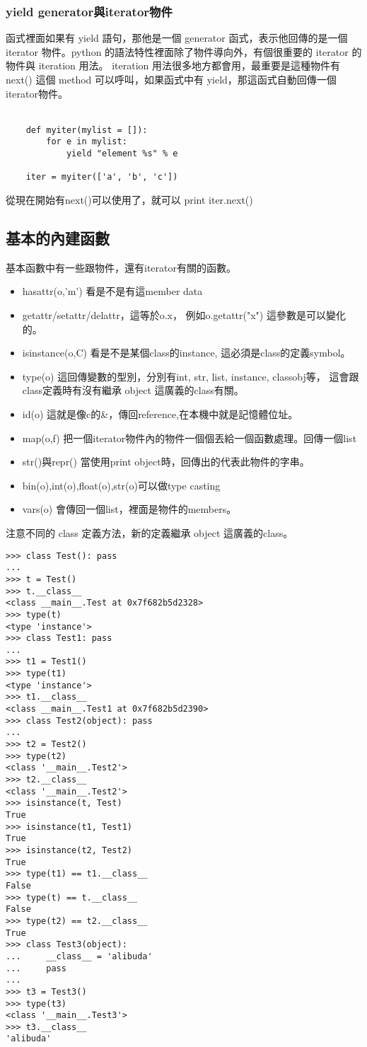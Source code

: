     \subsubsection{yield generator與iterator物件}
    函式裡面如果有 yield 語句，那他是一個 generator 函式，表示他回傳的是一個
    iterator 物件。python 的語法特性裡面除了物件導向外，有個很重要的 iterator
    的物件與 iteration 用法。 iteration 用法很多地方都會用，最重要是這種物件有
    next() 這個 method 可以呼叫，如果函式中有 yield，那這函式自動回傳一個
    iterator物件。
    \\\\
    \begin{verbatim}
    def myiter(mylist = []):
        for e in mylist:
            yield "element %s" % e

    iter = myiter(['a', 'b', 'c'])
    \end{verbatim}
    從現在開始有next()可以使用了，就可以 print iter.next()

  \subsection{基本的內建函數}
  基本函數中有一些跟物件，還有iterator有關的函數。
  \begin{itemize}
    \item hasattr(o,'m') 看是不是有這member data
    \item getattr/setattr/delattr，這等於o.x， 例如o.getattr("x")
      這參數是可以變化的。
    \item isinstance(o,C) 看是不是某個class的instance, 這必須是class的定義symbol。
    \item type(o) 這回傳變數的型別，分別有int, str, list, instance, classobj等，
      這會跟class定義時有沒有繼承 object 這廣義的class有關。
    \item id(o) 這就是像c的\&，傳回reference,在本機中就是記憶體位址。
    \item map(o,f) 把一個iterator物件內的物件一個個丟給一個函數處理。回傳一個list
    \item str()與repr() 當使用print object時，回傳出的代表此物件的字串。
    \item bin(o),int(o),float(o),str(o)可以做type casting
    \item vars(o) 會傳回一個list，裡面是物件的members。
  \end{itemize}
  注意不同的 class 定義方法，新的定義繼承 object 這廣義的class。
  \begin{verbatim}
>>> class Test(): pass
... 
>>> t = Test()
>>> t.__class__
<class __main__.Test at 0x7f682b5d2328>
>>> type(t)
<type 'instance'>
>>> class Test1: pass
... 
>>> t1 = Test1()
>>> type(t1)
<type 'instance'>
>>> t1.__class__
<class __main__.Test1 at 0x7f682b5d2390>
>>> class Test2(object): pass
... 
>>> t2 = Test2()
>>> type(t2)
<class '__main__.Test2'>
>>> t2.__class__
<class '__main__.Test2'>
>>> isinstance(t, Test)
True
>>> isinstance(t1, Test1)
True
>>> isinstance(t2, Test2)
True
>>> type(t1) == t1.__class__
False
>>> type(t) == t.__class__
False
>>> type(t2) == t2.__class__
True
>>> class Test3(object):
...     __class__ = 'alibuda'
...     pass
... 
>>> t3 = Test3()
>>> type(t3)
<class '__main__.Test3'>
>>> t3.__class__
'alibuda'
  \end{verbatim}

